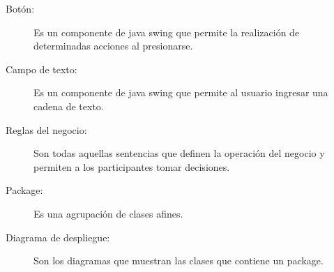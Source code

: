 \begin{description}
	\item[Botón:] Es un componente de java swing que permite la realización de determinadas acciones al presionarse.
\end{description}

\begin{description}
	\item[Campo de texto:] Es un componente de java swing que permite al usuario ingresar una cadena de texto.
\end{description}

\begin{description}
	\item[Reglas del negocio:] Son todas aquellas sentencias que definen la operación del negocio y permiten a los participantes tomar decisiones.
\end{description}

\begin{description}
	\item[Package:] Es una agrupación de clases afines.
\end{description}

\begin{description}
	\item[Diagrama de despliegue:] Son los diagramas que muestran las clases que contiene un package.
\end{description}


